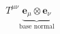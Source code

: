 \documentclass[preview]{standalone}
\begin{document}
\begin{align*}
T^{\mu\nu} \underbrace{\textbf{e}_{\mu}\otimes \textbf{e}_{\nu}}_{\text{base normal}}
\end{align*}
\end{document}
